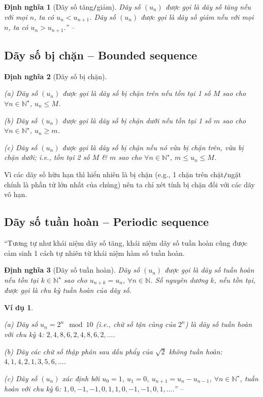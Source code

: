 \documentclass[oneside]{book}
\numberwithin{equation}{section}
\newtheorem{dinhnghia}{Định nghĩa}[section]
\newtheorem{vidu}{Ví dụ}[section]
\begin{document}
\begin{dinhnghia}[Dãy số tăng\texttt{/}giảm]
	Dãy số $(u_n)$ được gọi là \emph{dãy số tăng} nếu với mọi $n$, ta có $u_n < u_{n+1}$. Dãy số $(u_n)$ được gọi là \emph{dãy số giảm} nếu với mọi $n$, ta có $u_n > u_{n+1}$.'' -- \cite[p. 119]{TL_chuyen_Toan_Dai_So_Giai_Tich_11}
\end{dinhnghia}

\subsection{Dãy số bị chặn -- Bounded sequence}

\begin{dinhnghia}[Dãy số bị chặn]
	\begin{enumerate*}
		\item[(a)] Dãy số $(u_n)$ được gọi là \emph{dãy số bị chặn trên} nếu tồn tại 1 số $M$ sao cho $\forall n\in\mathbb{N}^\star$, $u_n\le M$.
		\item[(b)] Dãy số $(u_n)$ được gọi là \emph{dãy số bị chặn dưới} nếu tồn tại 1 số $m$ sao cho $\forall n\in\mathbb{N}^\star$, $u_n\ge m$.
		\item[(c)] Dãy số $(u_n)$ được gọi là \emph{dãy số bị chặn} nếu nó vừa bị chặn trên, vừa bị chặn dưới; i.e., tồn tại 2 số $M$ \& $m$ sao cho $\forall n\in\mathbb{N}^\star$, $m\le u_n\le M$.
	\end{enumerate*}
\end{dinhnghia}
Vì các dãy số hữu hạn thì hiển nhiên là bị chặn (e.g., 1 chặn trên chặt\texttt{/}ngặt chính là phần tử lớn nhất của chúng) nên ta chỉ xét tính bị chặn đối với các dãy vô hạn.

\subsection{Dãy số tuần hoàn -- Periodic sequence}
``Tương tự như khái niệm dãy số tăng, khái niệm dãy số tuần hoàn cũng được cảm sinh 1 cách tự nhiên từ khái niệm hàm số tuần hoàn.

\begin{dinhnghia}[Dãy số tuần hoàn]
	Dãy số $(u_n)$ được gọi là \emph{dãy số tuần hoàn} nếu tồn tại $k\in\mathbb{N}^\star$ sao cho $u_{n+k} = u_n$, $\forall n\in\mathbb{N}$. Số nguyên dương $k$, nếu tồn tại, được gọi là \emph{chu kỳ tuần hoàn} của dãy số.
\end{dinhnghia}

\begin{vidu}
	\begin{enumerate*}
		\item[(a)] Dãy số $u_n = 2^n\mod 10$ (i.e., chữ số tận cùng của $2^n$) là dãy số tuần hoàn với chu kỳ $4$: $2,4,8,6,2,4,8,6,2,\ldots$.
		\item[(b)] Dãy các chữ số thập phân sau dấu phẩy của $\sqrt{2}$ không tuần hoàn: $4,1,4,2,1,3,5,6,\ldots$.
		\item[(c)] Dãy số $(u_n)$ xác định bởi $u_0 = 1$, $u_1 = 0$, $u_{n+1} = u_n - u_{n-1}$, $\forall n\in\mathbb{N}^\star$, tuần hoàn với chu kỳ $6$: $1,0,-1,-1,0,1,1,0,-1,-1,0,1,\ldots$.'' -- \cite[p. 121]{TL_chuyen_Toan_Dai_So_Giai_Tich_11}
	\end{enumerate*}
\end{vidu}
\end{document}
